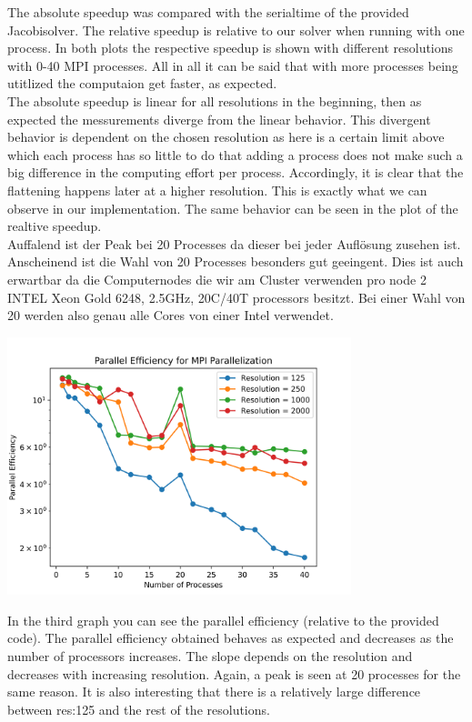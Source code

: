 \documentclass[10pt,a4paper]{article}
\begin{document}
The absolute speedup was compared with the serialtime of the provided Jacobisolver. The relative speedup 
is relative to our solver when running with one process. In both plots the respective speedup is shown with 
different resolutions with 0-40 MPI processes. All in all it can be said that with more processes being 
utitlized the computaion get faster, as expected. \\

The absolute speedup is linear for all resolutions in the beginning, then as expected the messurements 
diverge from the linear behavior. This divergent behavior is dependent on the chosen resolution as here is 
a certain limit above which each process has so little to do that adding a process does not make such a 
big difference in the computing effort per process. Accordingly, it is clear that the flattening happens 
later at a higher resolution. This is exactly what we can observe in our implementation. The same behavior 
can be seen in the plot of the realtive speedup. \\



Auffalend ist der Peak bei 20 Processes da dieser bei jeder Auflösung zusehen ist. 
Anscheinend ist die Wahl von 20 Processes besonders gut geeingent. Dies ist auch 
erwartbar da die Computernodes die wir am Cluster verwenden pro node 2 INTEL Xeon 
Gold 6248, 2.5GHz, 20C/40T processors besitzt. Bei einer Wahl von 20 werden also 
genau alle Cores von einer Intel verwendet. 


\begin{center}
    \includegraphics[width=10cm]{analysis/parallelEfficiency.png}
\end{center}

In the third graph you can see the parallel efficiency (relative to the provided code). 
The parallel efficiency obtained behaves as expected and decreases as the number of 
processors increases. The slope depends on the resolution and decreases with increasing 
resolution. Again, a peak is seen at 20 processes for the same reason. It is also 
interesting that there is a relatively large difference between res:125 and the rest 
of the resolutions.
\end{document}
